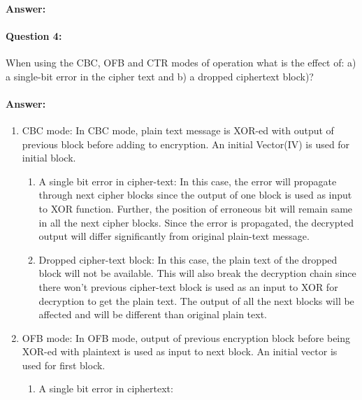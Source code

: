 \documentclass{article}
\begin{document}
    \paragraph{Answer: \newline}
    
    
    \paragraph{Question 4:} When using the CBC, OFB and CTR modes of operation what is the effect of: a) a single-bit error in the cipher text and b) a dropped ciphertext block)?
    \paragraph{Answer: \newline}
    \begin{enumerate}
        \item CBC mode: In CBC mode, plain text message is XOR-ed with output of previous block before adding to encryption. An initial Vector(IV) is used for initial block. 
            \begin{enumerate}
                \item A single bit error in cipher-text: \newline
                In this case, the error will propagate through next cipher blocks since the output of one block is used as input to XOR function. Further, the position of erroneous bit will remain same in all the next cipher blocks. Since the error is propagated, the decrypted output will differ significantly from original plain-text message.
                \item Dropped cipher-text block:\newline
                In this case, the plain text of the dropped block will not be available. This will also break the decryption chain since there won't previous cipher-text block is used as an input to XOR for decryption to get the plain text. The output of all the next blocks will be affected and will be different than original plain text.
            \end{enumerate}
        \item OFB mode: In OFB mode, output of previous encryption block before being XOR-ed with plaintext is used as input to next block. An initial vector is used for first block.
            \begin{enumerate}
                \item A single bit error in ciphertext:\newline

\end{enumerate}
\end{enumerate}
\end{document}
